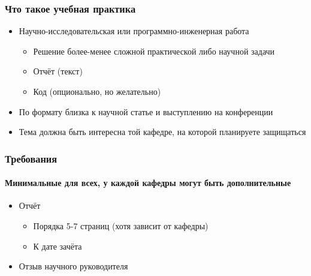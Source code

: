 \documentclass{../../slides-style}
\begin{document}
    
    \begin{frame}[plain]
        \titlepage
    \end{frame}

    \begin{frame}
        \frametitle{Что такое учебная практика}
        \begin{itemize}
            \item Научно-исследовательская или программно-инженерная работа%
            \begin{itemize}
                \item Решение более-менее сложной практической либо научной задачи
                \item Отчёт (текст)
                \item Код (опционально, но желательно)
            \end{itemize}
            \item По формату близка к научной статье и выступлению на конференции
            \item Тема должна быть интересна той кафедре, на которой планируете защищаться
        \end{itemize}
    \end{frame}

    \begin{frame}
        \frametitle{Требования}
        \framesubtitle{Минимальные для всех, у каждой кафедры могут быть дополнительные}
        \begin{itemize}
            \item Отчёт
            \begin{itemize}
                \item Порядка 5-7 страниц (хотя зависит от кафедры)
                \item К дате зачёта
            \end{itemize}
            \item Отзыв научного руководителя
        \end{itemize}
    \end{frame}
\end{document}
